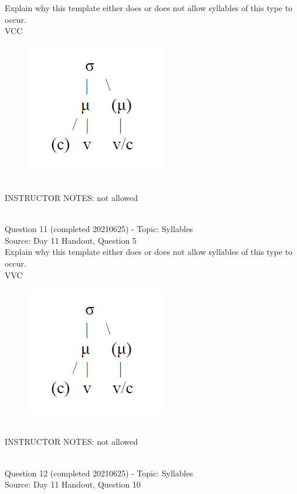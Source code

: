\documentclass[12pt]{article}
\begin{document}
Explain why this template either does or does not allow syllables of this type to occur.\\

VCC

\begin{figure}[H]
\includegraphics{../images/ponapean_syllabletemplate.png}
\end{figure}

~\\
INSTRUCTOR NOTES: not allowed


~\\

{\large Question 11} (completed 20210625) - Topic: Syllables\\
Source: Day 11 Handout, Question 5\\

Explain why this template either does or does not allow syllables of this type to occur.\\

VVC

\begin{figure}[H]
\includegraphics{../images/ponapean_syllabletemplate.png}
\end{figure}

~\\
INSTRUCTOR NOTES: not allowed


~\\

{\large Question 12} (completed 20210625) - Topic: Syllables\\
Source: Day 11 Handout, Question 10\\
\end{document}
